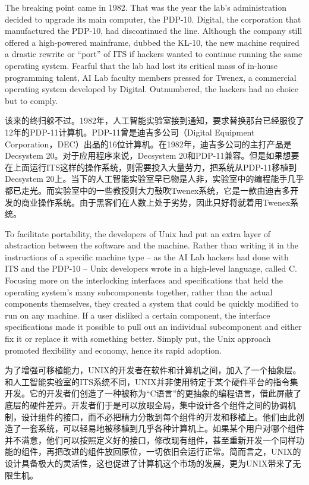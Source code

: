 \ifdefined\eng
The breaking point came in 1982. That was the year the lab's administration decided to upgrade its main computer, the PDP-10. Digital, the corporation that manufactured the PDP-10, had discontinued the line. Although the company still offered a high-powered mainframe, dubbed the KL-10, the new machine required a drastic rewrite or ``port'' of ITS if hackers wanted to continue running the same operating system. Fearful that the lab had lost its critical mass of in-house programming talent, AI Lab faculty members pressed for Twenex, a commercial operating system developed by Digital. Outnumbered, the hackers had no choice but to comply.
\fi

\ifdefined\chs
该来的终归躲不过。1982年，人工智能实验室接到通知，要求替换那台已经服役了12年的PDP-11计算机。PDP-11曾是迪吉多公司（Digital Equipment Corporation，DEC）出品的16位计算机。在1982年，迪吉多公司的主打产品是Decsystem 20。对于应用程序来说，Decsystem 20和PDP-11兼容。但是如果想要在上面运行ITS这样的操作系统，则需要投入大量劳力，把系统从PDP-11移植到Decsystem 20上。当下的人工智能实验室早已物是人非，实验室中的编程能手几乎都已走光。而实验室中的一些教授则大力鼓吹Twenex系统，它是一款由迪吉多开发的商业操作系统。由于黑客们在人数上处于劣势，因此只好将就着用Twenex系统。
\fi
\fi

\ifdefined\vtwo
\ifdefined\eng
To facilitate portability, the developers of Unix had put an extra layer of abstraction between the software and the machine. Rather than writing it in the instructions of a specific machine type -- as the AI Lab hackers had done with ITS and the PDP-10 -- Unix developers wrote in a high-level language, called C. Focusing more on the interlocking interfaces and specifications that held the operating system's many subcomponents together, rather than the actual components themselves, they created a system that could be quickly modified to run on any machine. If a user disliked a certain component, the interface specifications made it possible to pull out an individual subcomponent and either fix it or replace it with something better. Simply put, the Unix approach promoted flexibility and economy, hence its rapid adoption.
\fi

\ifdefined\chs
为了增强可移植能力，UNIX的开发者在软件和计算机之间，加入了一个抽象层。和人工智能实验室的ITS系统不同，UNIX并非使用特定于某个硬件平台的指令集开发。它的开发者们创造了一种被称为``C语言''的更抽象的编程语言，借此屏蔽了底层的硬件差异。开发者们于是可以放眼全局，集中设计各个组件之间的协调机制，设计组件的接口，而不必把精力分散到每个组件的开发和移植上。他们由此创造了一套系统，可以轻易地被移植到几乎各种计算机上。如果某个用户对哪个组件并不满意，他们可以按照定义好的接口，修改现有组件，甚至重新开发一个同样功能的组件，再把改进的组件放回原位，一切依旧会运行正常。简而言之，UNIX的设计具备极大的灵活性，这也促进了计算机这个市场的发展，更为UNIX带来了无限生机。
\fi

